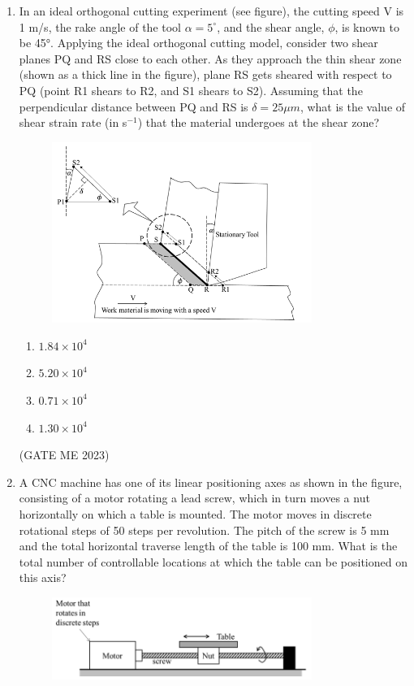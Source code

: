\documentclass[journal]{IEEEtran}
\begin{document}
\begin{enumerate}
\item In an ideal orthogonal cutting experiment (see figure), the cutting speed V is 1 m/s, the rake angle of the tool $\alpha = 5^\circ$, and the shear angle, $\phi$, is known to be 45°. Applying the ideal orthogonal cutting model, consider two shear planes PQ and RS close to each other. As they approach the thin shear zone (shown as a thick line in the figure), plane RS gets sheared with respect to PQ (point R1 shears to R2, and S1 shears to S2). Assuming that the perpendicular distance between PQ and RS is $\delta = 25 \mu m$, what is the value of shear strain rate (in s$^{-1}$) that the material undergoes at the shear zone?
\begin{figure}[H]
\centering
\includegraphics[width=0.8\textwidth]{Fig 42.png}
\caption{}
\label{fig:question44}
\end{figure}

\begin{enumerate}
    \item $ 1.84 \times 10^4 $
    \item $ 5.20 \times 10^4 $
    \item $ 0.71 \times 10^4 $
    \item $ 1.30 \times 10^4 $
\end{enumerate}
\hfill (GATE ME 2023)

\item A CNC machine has one of its linear positioning axes as shown in the figure, consisting of a motor rotating a lead screw, which in turn moves a nut horizontally on which a table is mounted. The motor moves in discrete rotational steps of 50 steps per revolution. The pitch of the screw is 5 mm and the total horizontal traverse length of the table is 100 mm. What is the total number of controllable locations at which the table can be positioned on this axis?
\begin{figure}[H]
\centering
\includegraphics[width=0.8\textwidth]{Fig 43.png}
\caption{}
\label{fig:question45}
\end{figure}


\end{enumerate}
\end{document}
